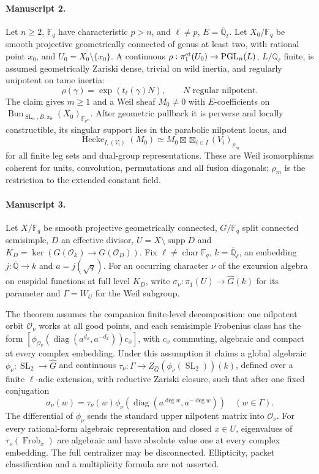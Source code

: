 \documentclass[11pt]{article}
\begin{document}
\paragraph{Manuscript 2.}
Let $n\ge2$, $\mathbb F_q$ have characteristic $p>n$, and $\ell\ne p$, $E=\overline{\mathbb Q}_{\ell}$. Let $X_0/\mathbb F_q$ be smooth projective geometrically connected of genus at least two, with rational point $x_0$, and $U_0=X_0\setminus\{x_0\}$. A continuous $\rho:\pi_1^{\rm et}(U_0)\to\operatorname{PGL}_n(L)$, $L/\mathbb Q_{\ell}$ finite, is assumed geometrically Zariski dense, trivial on wild inertia, and regularly unipotent on tame inertia:
\[
 \rho(\gamma)=\exp(t_{\ell}(\gamma)N),\qquad N\text{ regular nilpotent}.
\]
The claim gives $m\ge1$ and a Weil sheaf $M_0\ne0$ with $E$-coefficients on $\operatorname{Bun}_{\operatorname{SL}_n,B,x_0}(X_0)_{\mathbb F_{q^m}}$. After geometric pullback it is perverse and locally constructible, its singular support lies in the parabolic nilpotent locus, and
\[
 \operatorname{Hecke}_{I,(V_i)}(M_0)\simeq
 M_0\boxtimes\mathop{\boxtimes}_{i\in I}(V_i)_{\rho_m}
\]
for all finite leg sets and dual-group representations. These are Weil isomorphisms coherent for units, convolution, permutations and all fusion diagonals; $\rho_m$ is the restriction to the extended constant field.

\paragraph{Manuscript 3.}
Let $X/\mathbb F_q$ be smooth projective geometrically connected, $G/\mathbb F_q$ split connected semisimple, $D$ an effective divisor, $U=X\setminus\operatorname{supp}D$ and $K_D=\ker(G(\mathcal O_{\mathbb A})\to G(\mathcal O_D))$. Fix $\ell\ne\operatorname{char}\mathbb F_q$, $k=\overline{\mathbb Q}_{\ell}$, an embedding $j:\overline{\mathbb Q}\to k$ and $a=j(\sqrt q)$. For an occurring character $\nu$ of the excursion algebra on cuspidal functions at full level $K_D$, write $\sigma_{\nu}:\pi_1(U)\to\widehat G(k)$ for its parameter and $\Gamma=W_U$ for the Weil subgroup.

The theorem assumes the companion finite-level decomposition: one nilpotent orbit $\mathcal O_{\nu}$ works at all good points, and each semisimple Frobenius class has the form $[\phi_{\mathcal O_{\nu}}(\operatorname{diag}(a^{d_x},a^{-d_x}))c_x]$, with $c_x$ commuting, algebraic and compact at every complex embedding. Under this assumption it claims a global algebraic $\phi_{\nu}:\operatorname{SL}_2\to\widehat G$ and continuous $\tau_{\nu}:\Gamma\to Z_{\widehat G}(\phi_{\nu}(\operatorname{SL}_2))(k)$, defined over a finite $\ell$-adic extension, with reductive Zariski closure, such that after one fixed conjugation
\[
 \sigma_{\nu}(w)=\tau_{\nu}(w)\phi_{\nu}(\operatorname{diag}(a^{\deg w},a^{-\deg w}))\quad(w\in\Gamma).
\]
The differential of $\phi_{\nu}$ sends the standard upper nilpotent matrix into $\mathcal O_{\nu}$. For every rational-form algebraic representation and closed $x\in U$, eigenvalues of $\tau_{\nu}(\operatorname{Frob}_x)$ are algebraic and have absolute value one at every complex embedding. The full centralizer may be disconnected. Ellipticity, packet classification and a multiplicity formula are not asserted.
\end{document}

